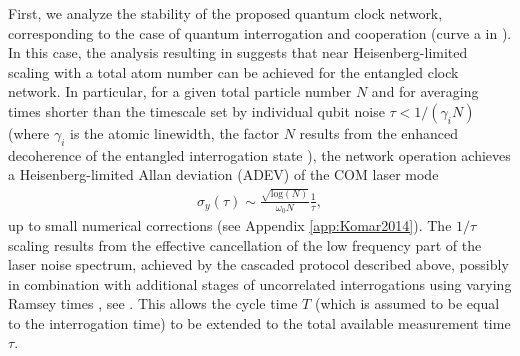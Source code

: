First, we analyze the stability of the proposed quantum clock network,
corresponding to the case of quantum interrogation and cooperation (curve a in
). In this case, the analysis resulting in 
suggests that near Heisenberg-limited  scaling with a total atom number can be achieved
for the entangled clock network. 
In particular, for a given total particle number $N$ and for averaging times
shorter than the timescale set by individual qubit noise $\tau < 1/(\gamma_i N)$
(where $\gamma_i$ is the atomic linewidth, the factor $N$ results from the
enhanced decoherence of the entangled interrogation state
\cite{Huelga1997}), the network operation achieves a Heisenberg-limited Allan
deviation (ADEV) of the COM laser mode
\begin{align}
\label{eq:ADEV1}
 	\sigma_y(\tau) 
	\sim \frac{ \sqrt{\textrm{log}(N)}}{\omega_0 N} \frac{1}{\tau},
\end{align}
up to small numerical corrections (see Appendix \ref{app:Komar2014}).
The $1/\tau$ scaling results from the effective cancellation of the low
frequency part of the laser noise spectrum, achieved
by the cascaded protocol described above, possibly in combination with additional stages of uncorrelated interrogations using varying Ramsey times \cite{Rosenband2013,Borregaard2013}, see \cite{Kessler2014}.
This allows the cycle time $T$ (which is assumed to be equal to
the interrogation time) to be extended to the total available measurement time
$\tau$.
